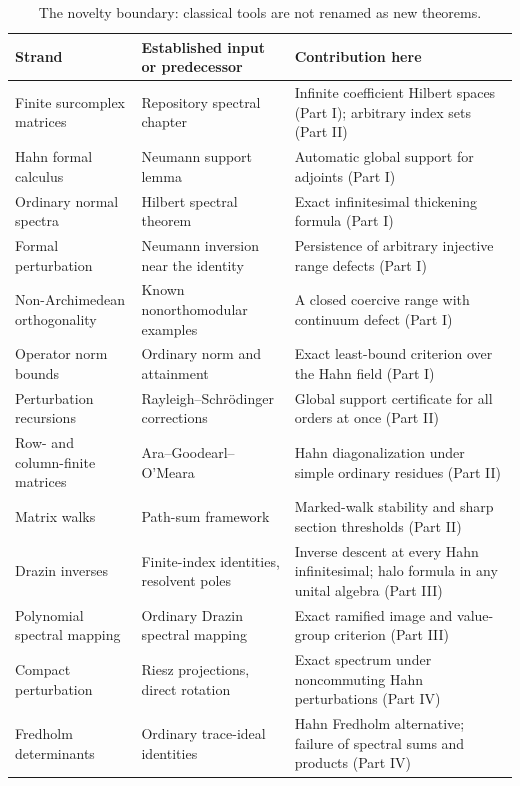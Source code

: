 \documentclass[11pt,a4paper]{article}
\numberwithin{equation}{section}
\theoremstyle{definition}
\theoremstyle{remark}
\begin{document}
\begin{table}[ht]
\centering\small
\begin{tabularx}{\textwidth}{@{}p{}YY@{}}
\toprule
Strand & Established input or predecessor & Contribution here\\
\midrule
Finite surcomplex matrices & Repository spectral chapter & Infinite coefficient Hilbert spaces (Part I); arbitrary index sets (Part II)\\
Hahn formal calculus & Neumann support lemma & Automatic global support for adjoints (Part I)\\
Ordinary normal spectra & Hilbert spectral theorem & Exact infinitesimal thickening formula (Part I)\\
Formal perturbation & Neumann inversion near the identity & Persistence of arbitrary injective range defects (Part I)\\
Non-Archimedean orthogonality & Known nonorthomodular examples & A closed coercive range with continuum defect (Part I)\\
Operator norm bounds & Ordinary norm and attainment & Exact least-bound criterion over the Hahn field (Part I)\\
Perturbation recursions & Rayleigh--Schr\"odinger corrections & Global support certificate for all orders at once (Part II)\\
Row- and column-finite matrices & Ara--Goodearl--O'Meara & Hahn diagonalization under simple ordinary residues (Part II)\\
Matrix walks & Path-sum framework & Marked-walk stability and sharp section thresholds (Part II)\\
Drazin inverses & Finite-index identities, resolvent poles & Inverse descent at every Hahn infinitesimal; halo formula in any unital algebra (Part III)\\
Polynomial spectral mapping & Ordinary Drazin spectral mapping & Exact ramified image and value-group criterion (Part III)\\
Compact perturbation & Riesz projections, direct rotation & Exact spectrum under noncommuting Hahn perturbations (Part IV)\\
Fredholm determinants & Ordinary trace-ideal identities & Hahn Fredholm alternative; failure of spectral sums and products (Part IV)\\
\bottomrule
\end{tabularx}
\caption{The novelty boundary: classical tools are not renamed as new
theorems.}\label{ihs:tab:novelty}
\end{table}
\end{document}
